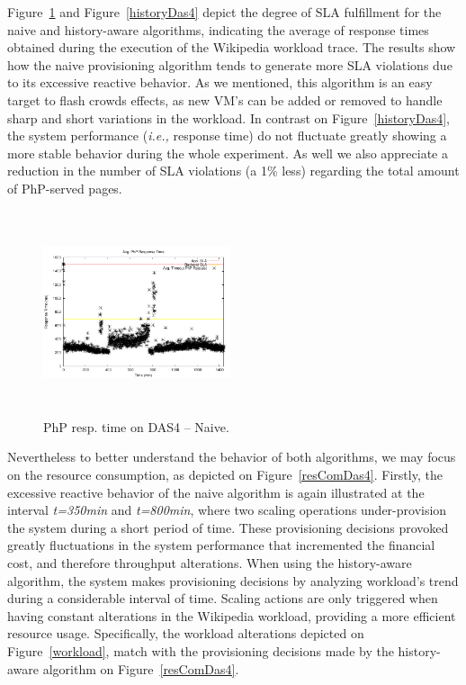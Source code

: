 Figure~\ref{naiveDas4} and Figure~\ref{historyDas4} depict the degree of SLA fulfillment for the naive and history-aware algorithms, indicating the average of response times obtained during the execution of the Wikipedia workload trace. The results show how the naive provisioning algorithm tends to generate more SLA violations due to its excessive reactive behavior. As we mentioned, this algorithm is an easy target to flash crowds effects, as new VM's can be added or removed  to handle sharp and short variations in the workload. In contrast on Figure~\ref{historyDas4}, the system performance (\emph{i.e.,} response time) do not fluctuate greatly showing a more stable behavior during the whole experiment. As well we also appreciate a reduction in the number of SLA violations (a 1\% less) regarding the total amount of PhP-served pages.

\begin{figure}

\begin{center}
\includegraphics[width=0.49\textwidth, height=6cm]{./images/homogeneous/avgTimeout_PhP_naive}
\end{center}
\caption{PhP resp. time on DAS4 -- Naive.}
\label{naiveDas4}
\end{figure}

Nevertheless to better understand the behavior of both algorithms, we may focus on the resource consumption, as depicted on Figure~\ref{resComDas4}. Firstly, the excessive reactive behavior of the naive algorithm is again illustrated at the interval \emph{t=350min} and \emph{t=800min}, where two scaling operations under-provision the system during a short period of time. These provisioning decisions provoked greatly fluctuations in the system performance that incremented the financial cost, and therefore throughput alterations. When using the history-aware algorithm, the system makes provisioning decisions by analyzing workload's trend during a considerable interval of time. Scaling actions are only triggered when having constant alterations in the Wikipedia workload, providing a more efficient resource usage. Specifically, the workload alterations depicted on Figure~\ref{workload}, match with the provisioning decisions made by the history-aware algorithm on Figure~\ref{resComDas4}.

